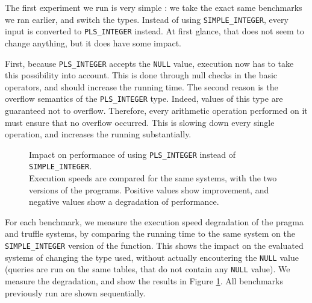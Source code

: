 \documentclass[twoside,11pt,a4paper]{article}
\newcommand{\pls}[1]{\small\texttt{#1}\normalsize}
\newcommand{\plstype}[1]{\pls{#1}}
\newcommand{\plsi}{\plstype{PLS\_INTEGER}}
\newcommand{\simpleint}{\plstype{SIMPLE\_INTEGER}}
\newcommand{\plsnull}{\pls{NULL}}
\newcommand{\benchsystem}[1]{\textsf{#1}}
\newcommand{\ncpg}{\benchsystem{pragma}}
\newcommand{\truffle}{\benchsystem{truffle}}
\begin{document}
The first experiment we run is very simple : we take the exact same benchmarks we ran earlier, and switch the types. Instead of using \simpleint{}, every input is converted to \plsi{} instead. At first glance, that does not seem to change anything, but it does have some impact.

First, because \plsi{} accepts the \plsnull{} value, execution now has to take this possibility into account. This is done through null checks in the basic operators, and should increase the running time. The second reason is the overflow semantics of the \plsi{} type. Indeed, values of this type are guaranteed not to overflow. Therefore, every arithmetic operation performed on it must ensure that no overflow occurred. This is slowing down every single operation, and increases the running substantially.

\begin{figure}[tp]
	\centering
	\caption[Impact on performance of using \plsi{} instead of \simpleint{}]{Impact on performance of using \plsi{} instead of \simpleint{}.\\
			\small{}Execution speeds are compared for the same systems, with the two versions of the programs. Positive values show improvement, and negative values show a degradation of performance.}
	\label{fig:exp2a}
\end{figure}

For each benchmark, we measure the execution speed degradation of the \ncpg{} and \truffle{} systems, by comparing the running time to the same system on the \simpleint{} version of the function. This shows the impact on the evaluated systems of changing the type used, without actually encoutering the \plsnull{} value (queries are run on the same tables, that do not contain any \plsnull{} value). We measure the degradation, and show the results in Figure \ref{fig:exp2a}. All benchmarks previously run are shown sequentially.
\end{document}
